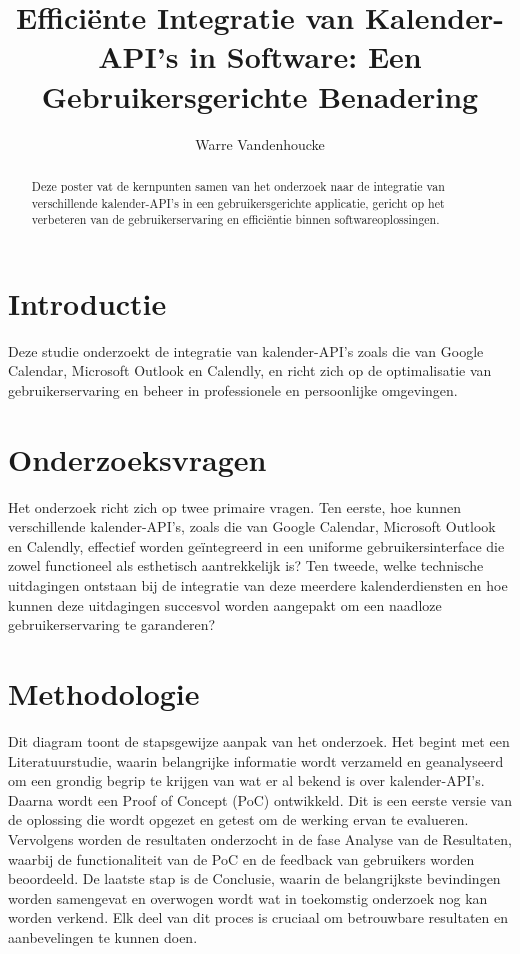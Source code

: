 \documentclass[a0,portrait]{hogent-poster}
\title{Efficiënte Integratie van Kalender-API's in Software: Een Gebruikersgerichte Benadering}
\author{Warre Vandenhoucke}
\begin{document}
    
    \maketitle
    
    \begin{abstract}
        Deze poster vat de kernpunten samen van het onderzoek naar de integratie van verschillende kalender-API's in een gebruikersgerichte applicatie, gericht op het verbeteren van de gebruikerservaring en efficiëntie binnen softwareoplossingen.
    \end{abstract}
    
    \begin{multicols}{2} %
        
        \section{Introductie}
        Deze studie onderzoekt de integratie van kalender-API's zoals die van Google Calendar, Microsoft Outlook en Calendly, en richt zich op de optimalisatie van gebruikerservaring en beheer in professionele en persoonlijke omgevingen.
        
        \section{Onderzoeksvragen}
        Het onderzoek richt zich op twee primaire vragen. Ten eerste, hoe kunnen verschillende kalender-API's, zoals die van Google Calendar, Microsoft Outlook en Calendly, effectief worden geïntegreerd in een uniforme gebruikersinterface die zowel functioneel als esthetisch aantrekkelijk is? Ten tweede, welke technische uitdagingen ontstaan bij de integratie van deze meerdere kalenderdiensten en hoe kunnen deze uitdagingen succesvol worden aangepakt om een naadloze gebruikerservaring te garanderen?
        
        \section{Methodologie}
        Dit diagram toont de stapsgewijze aanpak van het onderzoek. Het begint met een Literatuurstudie, waarin belangrijke informatie wordt verzameld en geanalyseerd om een grondig begrip te krijgen van wat er al bekend is over kalender-API's. Daarna wordt een Proof of Concept (PoC) ontwikkeld. Dit is een eerste versie van de oplossing die wordt opgezet en getest om de werking ervan te evalueren. Vervolgens worden de resultaten onderzocht in de fase Analyse van de Resultaten, waarbij de functionaliteit van de PoC en de feedback van gebruikers worden beoordeeld. De laatste stap is de Conclusie, waarin de belangrijkste bevindingen worden samengevat en overwogen wordt wat in toekomstig onderzoek nog kan worden verkend. Elk deel van dit proces is cruciaal om betrouwbare resultaten en aanbevelingen te kunnen doen.
        

\end{multicols}
\end{document}
